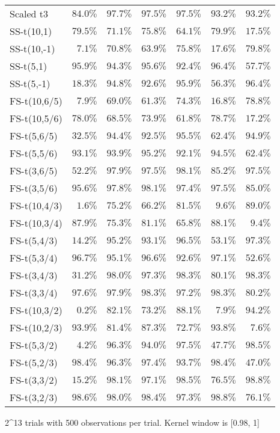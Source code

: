 \begin{longtable}{lrrrrrr}
Scaled t3 & $84.0\%$ & $97.7\%$ & $97.5\%$ & $97.5\%$ & $93.2\%$ & $93.2\%$ \\ 
SS-t(10,1) & $79.5\%$ & $71.1\%$ & $75.8\%$ & $64.1\%$ & $79.9\%$ & $17.5\%$ \\ 
SS-t(10,-1) & $7.1\%$ & $70.8\%$ & $63.9\%$ & $75.8\%$ & $17.6\%$ & $79.8\%$ \\ 
SS-t(5,1) & $95.9\%$ & $94.3\%$ & $95.6\%$ & $92.4\%$ & $96.4\%$ & $57.7\%$ \\ 
SS-t(5,-1) & $18.3\%$ & $94.8\%$ & $92.6\%$ & $95.9\%$ & $56.3\%$ & $96.4\%$ \\ 
FS-t(10,6/5) & $7.9\%$ & $69.0\%$ & $61.3\%$ & $74.3\%$ & $16.8\%$ & $78.8\%$ \\ 
FS-t(10,5/6) & $78.0\%$ & $68.5\%$ & $73.9\%$ & $61.8\%$ & $78.7\%$ & $17.2\%$ \\ 
FS-t(5,6/5) & $32.5\%$ & $94.4\%$ & $92.5\%$ & $95.5\%$ & $62.4\%$ & $94.9\%$ \\ 
FS-t(5,5/6) & $93.1\%$ & $93.9\%$ & $95.2\%$ & $92.1\%$ & $94.5\%$ & $62.4\%$ \\ 
FS-t(3,6/5) & $52.2\%$ & $97.9\%$ & $97.5\%$ & $98.1\%$ & $85.2\%$ & $97.5\%$ \\ 
FS-t(3,5/6) & $95.6\%$ & $97.8\%$ & $98.1\%$ & $97.4\%$ & $97.5\%$ & $85.0\%$ \\ 
FS-t(10,4/3) & $1.6\%$ & $75.2\%$ & $66.2\%$ & $81.5\%$ & $9.6\%$ & $89.0\%$ \\ 
FS-t(10,3/4) & $87.9\%$ & $75.3\%$ & $81.1\%$ & $65.8\%$ & $88.1\%$ & $9.4\%$ \\ 
FS-t(5,4/3) & $14.2\%$ & $95.2\%$ & $93.1\%$ & $96.5\%$ & $53.1\%$ & $97.3\%$ \\ 
FS-t(5,3/4) & $96.7\%$ & $95.1\%$ & $96.6\%$ & $92.6\%$ & $97.1\%$ & $52.6\%$ \\ 
FS-t(3,4/3) & $31.2\%$ & $98.0\%$ & $97.3\%$ & $98.3\%$ & $80.1\%$ & $98.3\%$ \\ 
FS-t(3,3/4) & $97.6\%$ & $97.9\%$ & $98.3\%$ & $97.2\%$ & $98.3\%$ & $80.2\%$ \\ 
FS-t(10,3/2) & $0.2\%$ & $82.1\%$ & $73.2\%$ & $88.1\%$ & $7.9\%$ & $94.2\%$ \\ 
FS-t(10,2/3) & $93.9\%$ & $81.4\%$ & $87.3\%$ & $72.7\%$ & $93.8\%$ & $7.6\%$ \\ 
FS-t(5,3/2) & $4.2\%$ & $96.3\%$ & $94.0\%$ & $97.5\%$ & $47.7\%$ & $98.5\%$ \\ 
FS-t(5,2/3) & $98.4\%$ & $96.3\%$ & $97.4\%$ & $93.7\%$ & $98.4\%$ & $47.0\%$ \\ 
FS-t(3,3/2) & $15.2\%$ & $98.1\%$ & $97.1\%$ & $98.5\%$ & $76.5\%$ & $98.8\%$ \\ 
FS-t(3,2/3) & $98.6\%$ & $98.0\%$ & $98.4\%$ & $97.3\%$ & $98.8\%$ & $76.1\%$ \\ 
\bottomrule
\end{longtable}
\begin{minipage}{\linewidth}
2\textasciicircum{}13 trials with 500 observations per trial. Kernel window is [0.98, 1]\\
\end{minipage}

